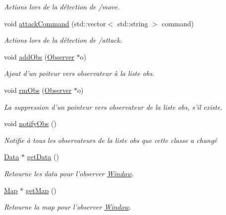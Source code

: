 \begin{DoxyCompactItemize}
\begin{DoxyCompactList}\small\item\em Actions lors de la détection de /move. \end{DoxyCompactList}\item 
\hypertarget{classGame_a27e73a42585e02a6c375413f803b0032}{void \hyperlink{classGame_a27e73a42585e02a6c375413f803b0032}{attack\+Command} (std\+::vector$<$ std\+::string $>$ command)}\label{classGame_a27e73a42585e02a6c375413f803b0032}

\begin{DoxyCompactList}\small\item\em Actions lors de la détection de /attack. \end{DoxyCompactList}\item 
void \hyperlink{classGame_a7c81b1033a3a8d6758ab0bf1c10a451c}{add\+Obs} (\hyperlink{classObserver}{Observer} $\ast$o)
\begin{DoxyCompactList}\small\item\em Ajout d'un poiteur vers observateur à la liste obs. \end{DoxyCompactList}\item 
void \hyperlink{classGame_a759618d920dd0e0f74f4bba89d35e56e}{rm\+Obs} (\hyperlink{classObserver}{Observer} $\ast$o)
\begin{DoxyCompactList}\small\item\em La suppression d'un pointeur vers observateur de la liste obs, s'il existe. \end{DoxyCompactList}\item 
\hypertarget{classGame_a3ac1bb304b96d6df0d350d39dc651cd2}{void \hyperlink{classGame_a3ac1bb304b96d6df0d350d39dc651cd2}{notify\+Obs} ()}\label{classGame_a3ac1bb304b96d6df0d350d39dc651cd2}

\begin{DoxyCompactList}\small\item\em Notifie à tous les observateurs de la liste obs que cette classe a changé \end{DoxyCompactList}\item 
\hypertarget{classGame_af36ccea6518e85542e7efc07ba425de0}{\hyperlink{classData}{Data} $\ast$ \hyperlink{classGame_af36ccea6518e85542e7efc07ba425de0}{get\+Data} ()}\label{classGame_af36ccea6518e85542e7efc07ba425de0}

\begin{DoxyCompactList}\small\item\em Retourne les data pour l'observer \hyperlink{classWindow}{Window}. \end{DoxyCompactList}\item 
\hypertarget{classGame_af2a02d3d8e78f4246c97ae06dd74f04f}{\hyperlink{classMap}{Map} $\ast$ \hyperlink{classGame_af2a02d3d8e78f4246c97ae06dd74f04f}{get\+Map} ()}\label{classGame_af2a02d3d8e78f4246c97ae06dd74f04f}

\begin{DoxyCompactList}\small\item\em Retourne la map pour l'observer \hyperlink{classWindow}{Window}. \end{DoxyCompactList}\end{DoxyCompactItemize}


